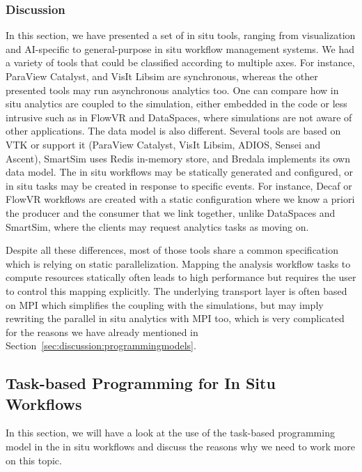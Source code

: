 \subsubsection{Discussion}
In this section, we have presented a set of in situ tools, ranging from visualization and AI-specific to general-purpose in situ workflow management systems. 
We had a variety of tools that could be classified according to multiple axes. For instance, ParaView Catalyst, and VisIt Libsim are synchronous, whereas the other presented tools may run asynchronous analytics too. One can compare how in situ analytics are coupled to the simulation, either embedded in the code or less intrusive such as in FlowVR and DataSpaces, where simulations are not aware of other applications. The data model is also different. Several tools are based on VTK or support it (ParaView Catalyst, VisIt Libsim, ADIOS, Sensei and Ascent), SmartSim uses Redis in-memory store, and Bredala implements its own data model. The in situ workflows may be statically generated and configured, or in situ tasks may be created in response to specific events. For instance, Decaf or FlowVR workflows are created with a static configuration where we know a priori the producer and the consumer that we link together, unlike DataSpaces and SmartSim, where the clients may request analytics tasks as moving on.  

Despite all these differences, most of those tools share a common specification which is relying on static parallelization.
Mapping the analysis workflow tasks to compute resources statically often leads to high performance but requires the user to control this mapping explicitly. The underlying transport layer is often based on MPI %
which simplifies the coupling with the simulations, but may imply rewriting the parallel in situ analytics with MPI too, which is very complicated for the reasons we have already mentioned in Section~\ref{sec:discussion:programmingmodels}.

 
\subsection{Task-based Programming for In Situ Workflows}\label{sec:insitu:taskbased}

In this section, we will have a look at the use of the task-based programming model in the in situ workflows and discuss the reasons why we need to work more on this topic.

